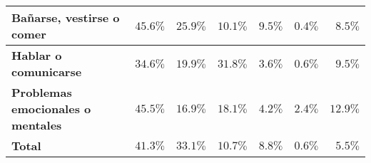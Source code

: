 \begin{table}[]
{\begin{tabular}{lllllll}
\multicolumn{1}{|m{3cm}|}{\textbf{Ba\~narse, vestirse o comer}}
& \multicolumn{1}{r|}{$45.6\%$}
& \multicolumn{1}{r|}{$25.9\%$}
& \multicolumn{1}{r|}{$10.1\%$}
& \multicolumn{1}{r|}{$9.5\%$}
& \multicolumn{1}{r|}{$0.4\%$}
& \multicolumn{1}{r|}{$8.5\%$} \\ \hline

\multicolumn{1}{|m{3cm}|}{\textbf{Hablar o comunicarse}}
& \multicolumn{1}{r|}{$34.6\%$}
& \multicolumn{1}{r|}{$19.9\%$}
& \multicolumn{1}{r|}{$31.8\%$}
& \multicolumn{1}{r|}{$3.6\%$}
& \multicolumn{1}{r|}{$0.6\%$}
& \multicolumn{1}{r|}{$9.5\%$} \\ \hline

\multicolumn{1}{|m{3cm}|}{\textbf{Problemas emocionales o mentales}}
& \multicolumn{1}{r|}{$45.5\%$}
& \multicolumn{1}{r|}{$16.9\%$}
& \multicolumn{1}{r|}{$18.1\%$}
& \multicolumn{1}{r|}{$4.2\%$}
& \multicolumn{1}{r|}{$2.4\%$}
& \multicolumn{1}{r|}{$12.9\%$} \\ \hline

\multicolumn{1}{|m{3cm}|}{\textbf{Total}}
& \multicolumn{1}{r|}{$41.3\%$}
& \multicolumn{1}{r|}{$33.1\%$}
& \multicolumn{1}{r|}{$10.7\%$}
& \multicolumn{1}{r|}{$8.8\%$}
& \multicolumn{1}{r|}{$0.6\%$}
& \multicolumn{1}{r|}{$5.5\%$} \\ \hline
\end{tabular}
}

\label{discapacidadCausa}
\end{table}
